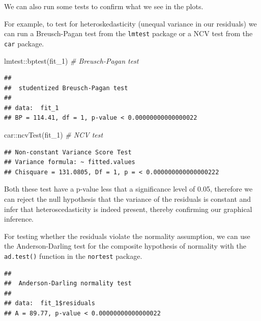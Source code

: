 \documentclass[
]{book}
\newenvironment{Shaded}{\begin{snugshade}}{\end{snugshade}}
\newcommand{\CommentTok}[1]{\textcolor[rgb]{0.56,0.35,0.01}{\textit{#1}}}
\newcommand{\FunctionTok}[1]{\textcolor[rgb]{0.00,0.00,0.00}{#1}}
\newcommand{\NormalTok}[1]{#1}
\newcommand{\SpecialCharTok}[1]{\textcolor[rgb]{0.00,0.00,0.00}{#1}}
\begin{document}
We can also run some tests to confirm what we see in the plots.

For example, to test for heteroskedasticity (unequal variance in our residuals) we can run a Breusch-Pagan test from the \texttt{lmtest} package or a NCV test from the \texttt{car} package.

\begin{Shaded}
\begin{Highlighting}[]
\NormalTok{lmtest}\SpecialCharTok{::}\FunctionTok{bptest}\NormalTok{(fit\_1)  }\CommentTok{\# Breusch{-}Pagan test}
\end{Highlighting}
\end{Shaded}

\begin{verbatim}
## 
##  studentized Breusch-Pagan test
## 
## data:  fit_1
## BP = 114.41, df = 1, p-value < 0.00000000000000022
\end{verbatim}

\begin{Shaded}
\begin{Highlighting}[]
\NormalTok{car}\SpecialCharTok{::}\FunctionTok{ncvTest}\NormalTok{(fit\_1) }\CommentTok{\# NCV test}
\end{Highlighting}
\end{Shaded}

\begin{verbatim}
## Non-constant Variance Score Test 
## Variance formula: ~ fitted.values 
## Chisquare = 131.0805, Df = 1, p = < 0.000000000000000222
\end{verbatim}

Both these test have a p-value less that a significance level of 0.05, therefore we can reject the null hypothesis that the variance of the residuals is constant and infer that heteroscedasticity is indeed present, thereby confirming our graphical inference.

For testing whether the residuals violate the normality assumption, we can use the Anderson-Darling test for the composite hypothesis of normality with the \texttt{ad.test()} function in the \texttt{nortest} package.

\begin{Shaded}
\end{Shaded}

\begin{verbatim}
## 
##  Anderson-Darling normality test
## 
## data:  fit_1$residuals
## A = 89.77, p-value < 0.00000000000000022
\end{verbatim}
\end{document}
